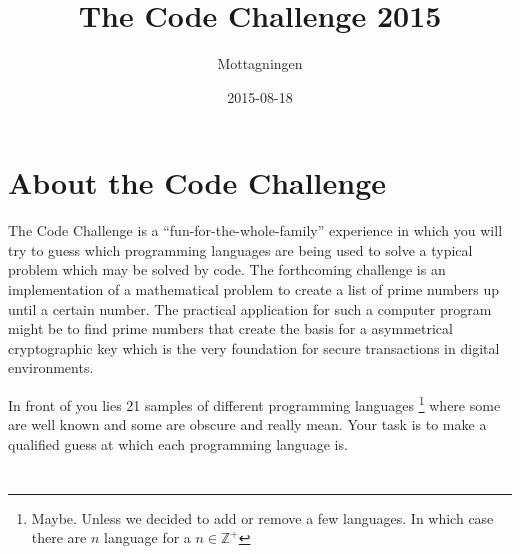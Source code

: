 \documentclass[a4paper]{report}
\title{The Code Challenge 2015}
\author{Mottagningen}
\date{2015-08-18}
\begin{document}
\maketitle
\setcounter{page}{2}

\chapter*{About the Code Challenge}
The Code Challenge is a ``fun-for-the-whole-family'' experience in which you
will try to guess which programming languages are being used to solve a
typical problem which may be solved by code. The forthcoming challenge is an
implementation of a mathematical problem to create a list of prime numbers
up until a certain number. The practical application for such a computer
program might be to find prime numbers that create the basis for a
asymmetrical cryptographic key which is the very foundation for secure
transactions in digital environments.

In front of you lies 21 samples of different programming languages
\footnote{Maybe. Unless we decided to add or remove a few languages.
    In which case there are $n$ language for a $n \in \mathbb{Z}^+$}
where some are well known and some are obscure and really mean.
Your task is to make a qualified guess at which each programming language is.

\newpage
{}
\setcounter{page}{0}
\chapter{}

\chapter{}

\chapter{}

\chapter{}

\chapter{}

\chapter{}

\end{document}
